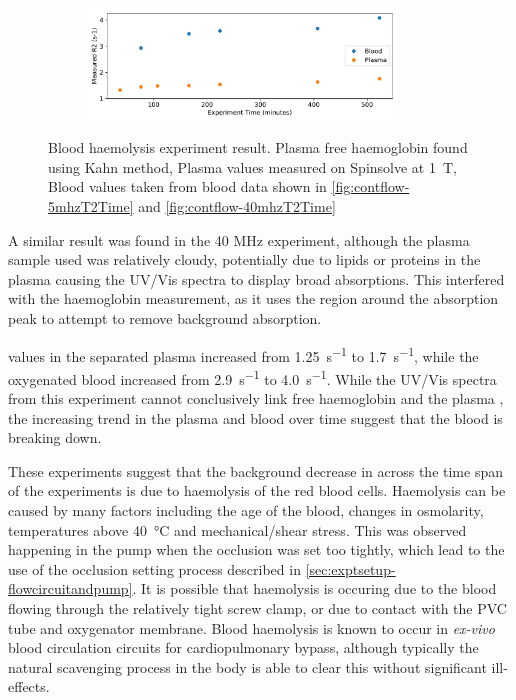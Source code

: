 \begin{figure}[h!tp]
\begin{subfigure}{\textwidth}
\includegraphics[width=0.9\textwidth]{figures/contflow/40haemolysePlasT2.pdf}
\end{subfigure}
\caption[Blood haemolysis experiment for 5 MHz and 40 MHz results]{Blood haemolysis experiment result. Plasma free haemoglobin found using Kahn method, Plasma \Rtwo values measured on Spinsolve at \SI{1}{T}, Blood \Rtwo values taken from blood data shown in \autoref{fig:contflow-5mhzT2Time} and \autoref{fig:contflow-40mhzT2Time}}
\label{fig:contflow-haemolyseResult}
\end{figure}

A similar result was found in the 40 MHz experiment, although the plasma sample used was relatively cloudy, potentially due to lipids or proteins in the plasma causing the UV/Vis spectra to display broad absorptions.
This interfered with the haemoglobin measurement, as it uses the region around the absorption peak to attempt to remove background absorption.

\Rtwo values in the separated plasma increased from \SI{1.25}{s^{-1}} to \SI{1.7}{s^{-1}}, while the oxygenated blood increased from \SI{2.9}{s^{-1}} to \SI{4.0}{s^{-1}}.
While the UV/Vis spectra from this experiment cannot conclusively link free haemoglobin and the plasma \Rtwo, the increasing trend in the plasma \Rtwo and blood \Rtwo over time suggest that the blood is breaking down.

These experiments suggest that the background decrease in \Ttwo across the time span of the experiments is due to haemolysis of the red blood cells.
Haemolysis can be caused by many factors including the age of the blood, changes in osmolarity, temperatures above \SI{40}{\celsius} and mechanical/shear stress\cite{Sowemimo-CokerRedbloodcell2002}.
This was observed happening in the pump when the occlusion was set too tightly, which lead to the use of the occlusion setting process described in \autoref{sec:exptsetup-flowcircuitandpump}.
It is possible that haemolysis is occuring due to the blood flowing through the relatively tight screw clamp, or due to contact with the PVC tube and oxygenator membrane.
Blood haemolysis is known to occur in \textit{ex-vivo} blood circulation circuits for cardiopulmonary bypass, although typically the natural scavenging process in the body is able to clear this without significant ill-effects\cite{VercaemstHemolysiscardiacsurgery2008}.

